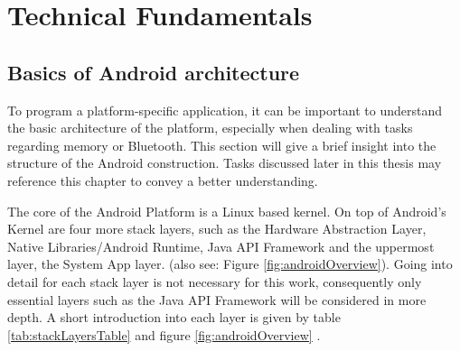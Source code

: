 \section{Technical Fundamentals}\label{techfFun}



	
\subsection{Basics of Android architecture}\label{sec:architecture}
{\large 
	To program a platform-specific application, it can be important to understand the basic architecture of the platform, especially when dealing with tasks regarding memory or Bluetooth. This section will give a brief insight into the structure of the Android construction. Tasks discussed later in this thesis may reference this chapter to convey a better understanding.
	
	The core of the Android Platform is a Linux based kernel. On top of Android's Kernel are four more stack layers, such as the Hardware Abstraction Layer, Native Libraries/Android Runtime, Java API Framework and the uppermost layer,  the System App layer. (also see: Figure \ref{fig:androidOverview}). Going into detail for each stack layer is not necessary for this work, consequently only essential layers such as the Java API Framework will be considered in more depth. A short introduction into each layer is given by table \ref{tab:stackLayersTable} and figure \ref{fig:androidOverview} .
	
}
